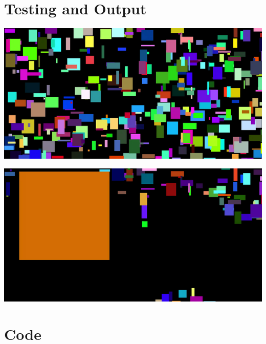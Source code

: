\documentclass[letterpaper, 24pt, final, onecolumn, titlepage] {article}
\begin{document}
\section{Testing and Output}
\begin{center}\includegraphics{capture1} \end{center}
\begin{center}\includegraphics{capture2} \end{center}


\section{Code}
\singlespacing
\end{document}
